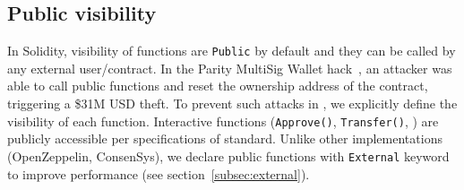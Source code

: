 %

\subsection{Public visibility}

In Solidity, visibility of functions are \texttt{Public} by default and they can be called by any external user/contract. In the Parity MultiSig Wallet hack~\cite{ParityFirstHack}, an attacker was able to call public functions and reset the ownership address of the contract, triggering a \$31M USD theft. To prevent such attacks in \sys, we explicitly define the visibility of each function. Interactive functions (\eg \texttt{Approve()}, \texttt{Transfer()}, \etc) are publicly accessible per specifications of \erc standard. { \blue Unlike other implementations (\eg OpenZeppelin, ConsenSys), we declare public functions with \texttt{External} keyword to improve performance (see section~\ref{subsec:external}).}

